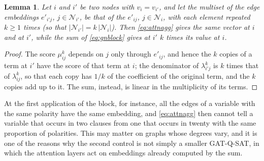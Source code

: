 \documentclass[11pt,a4paper]{article}
\newtheorem{lemma}{Lemma}
\begin{document}
\begin{lemma}\label{lem:degree}
Let $i$ and $i'$ be two nodes with $v_i = v_{i'}$, and let the multiset of the
edge embeddings $e'_{i'j}$, $j \in \mathcal N_{i'}$, be that of the
$e'_{ij}$, $j \in \mathcal N_i$, with each element repeated $k \ge 1$ times
(so that $|\mathcal N_{i'}| = k\, |\mathcal N_i|$). Then \eqref{eq:attnagg}
gives the same vector at $i$ and at $i'$, while the sum of \eqref{eq:gnblock}
gives at $i'$ $k$ times its value at $i$.
\end{lemma}

\begin{proof}
The score $\mu^k_{ij}$ depends on $j$ only through $e'_{ij}$, and hence the
$k$ copies of a term at $i'$ have the score of that term at $i$; the
denominator of $\lambda^k_{i'j}$ is $k$ times that of $\lambda^k_{ij}$, so that
each copy has $1/k$ of the coefficient of the original term, and the $k$
copies add up to it. The sum, instead, is linear in the multiplicity of its
terms.
\end{proof}

\noindent
At the first application of the block, for instance, all the edges of a
variable with the same polarity have the same embedding, and \eqref{eq:attnagg}
then cannot tell a variable that occurs in two clauses from one that occurs in
twenty with the same proportion of polarities. This may matter on graphs whose
degrees vary, and it is one of the reasons why the second control is not simply
a smaller GAT-Q-SAT, in which the attention layers act on embeddings already
computed by the sum.
\end{document}
